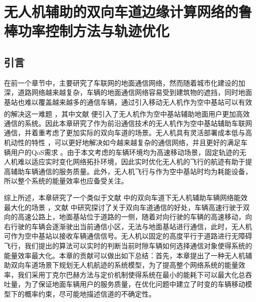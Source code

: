 \chapter{无人机辅助的双向车道边缘计算网络的鲁棒功率控制方法与轨迹优化}

\label{chap:table}
\section{引言}\label{section4-1}
\label{chap:introduction}
在前一个章节中，主要研究了车联网的地面通信网络，然而随着城市化建设的加深，道路网络越来越复杂，车辆的地面通信网络容易受到建筑物的遮挡，同时地面基站也难以覆盖越来越多的通信车辆，通过引入移动无人机作为空中基站可以有效的解决这一难题  \textsuperscript{\cite{Effect2020,Performance2022}}，其中文献 \cite{WirelessRelay5937283} 便引入了无人机作为空中基站辅助地面用户更加高效通信的系统。因此本章研究了作为前沿通信技术的无人机作为空中基站辅助车联网通信，并着重考虑了更加实际的双向车道的场景。无人机具有灵活部署成本低与高机动性的特性  \cite{无人机技术辅助的车联网,王智煊2023无人机辅助下的车联边缘计算卸载机制研究,Joint9453853}，可以更好地解决如今越来越复杂的通信网络，并且更好的满足车辆用户的QoS需求 \cite{无人机QoS9373692}。由于本文考虑的车辆环境均为高速移动场景，固定轨迹的无人机难以适应实时变化网络拓扑环境，因此实时优化无人机的飞行的航迹有助于提高辅助车辆通信的服务质量。此外，无人机飞行与作为空中基站时均为耗能设备，所以整个系统的能量效率也应备受关注。

综上所述，本章研究了一个类似于文献 \cite{twoway7091030}中的双向车道下无人机辅助车辆网络能效最大化的场景 ，文献 \cite{twoway5753961,twoway575396233,Spatial4490168,Stochastic6576809}中研究探讨了关于双向车道通信的好处，车辆高速行驶于双向的高速公路上，地面基站位于道路的一侧，随着对向行驶的车辆的高速移动，向右行驶的车辆会逐渐驶出当前通信小区，无法与地面基站进行通信，此时，无人机可作为空中基站以接收车辆通信信号。无人机以固定的高度平行于道路进行无障碍飞行，我们提出的算法可以实时的判断当前时隙车辆如何选择通信对象使得系统的能量效率最大化。本章的贡献可以做出如下总结：首先，本章提出了一种无人机辅助双向车道场景下规划无人机航迹的系统模型，为了提高整个网络系统的能量效率，我们采用丁克尔巴赫方法与定价机制使得系统在最小的能耗下可以最大化总吞吐量，为了保证地面车辆用户的服务质量，在优化问题中建立了时变的车辆移动模型下的概率约束，尽可能地描述信道的不确定性。
